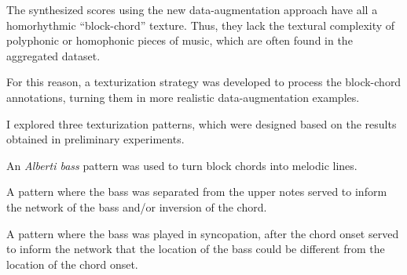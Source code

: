 
The synthesized scores using the new data-augmentation
approach have all a homorhythmic ``block-chord'' texture.
Thus, they lack the textural complexity of polyphonic or
homophonic pieces of music, which are often found in the
aggregated dataset.

For this reason, a texturization strategy was developed to
process the block-chord annotations, turning them in more
realistic data-augmentation examples.

I explored three texturization patterns, which were designed
based on the results obtained in preliminary experiments. 


An \emph{Alberti bass} pattern was used to turn block chords
into melodic lines.


A pattern where the bass was separated from the upper notes
served to inform the network of the bass and/or inversion of
the chord.


A pattern where the bass was played in syncopation, after
the chord onset served to inform the network that the
location of the bass could be different from the location of
the chord onset.

